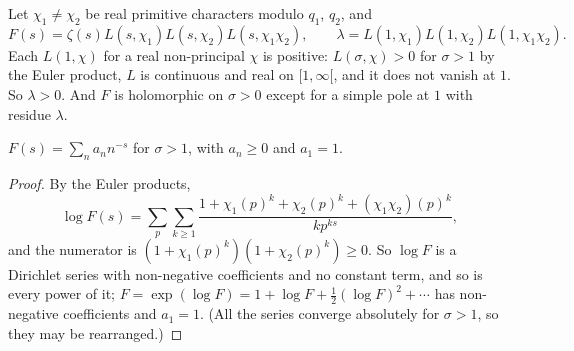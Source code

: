 Let $\chi_1\ne\chi_2$ be real primitive characters modulo $q_1$, $q_2$, and
\[
F(s)=\zeta(s)L(s,\chi_1)L(s,\chi_2)L(s,\chi_1\chi_2),\qquad\lambda=L(1,\chi_1)L(1,\chi_2)L(1,\chi_1\chi_2).
\]
Each $L(1,\chi)$ for a real non-principal $\chi$ is positive: $L(\sigma,\chi)>0$ for $\sigma>1$ by the Euler product, $L$ is continuous and real on $[1,\infty[$, and it does not vanish at $1$. So $\lambda>0$. And $F$ is holomorphic on $\sigma>0$ except for a simple pole at $1$ with residue $\lambda$.

\begin{lemma}\label{lem:Fpos}
$F(s)=\sum_na_nn^{-s}$ for $\sigma>1$, with $a_n\ge0$ and $a_1=1$.
\end{lemma}
\begin{proof}
By the Euler products,
\[
\log F(s)=\sum_p\sum_{k\ge1}\frac{1+\chi_1(p)^k+\chi_2(p)^k+(\chi_1\chi_2)(p)^k}{kp^{ks}},
\]
and the numerator is $(1+\chi_1(p)^k)(1+\chi_2(p)^k)\ge0$. So $\log F$ is a Dirichlet series with non-negative coefficients and no constant term, and so is every power of it; $F=\exp(\log F)=1+\log F+\frac12(\log F)^2+\cdots$ has non-negative coefficients and $a_1=1$.
(All the series converge absolutely for $\sigma>1$, so they may be rearranged.)
\end{proof}

